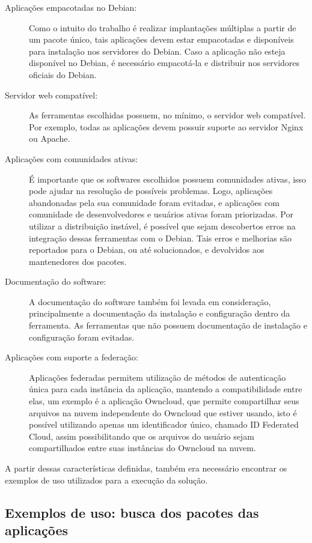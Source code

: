 \begin{description}
  \item  [Aplicações empacotadas no Debian:] Como o intuito do trabalho
  é realizar implantações múltiplas a partir de um pacote único, tais aplicações
  devem estar empacotadas e disponíveis para instalação nos servidores do Debian. Caso
a aplicação não esteja disponível no Debian, é necessário empacotá-la e distribuir
nos servidores oficiais do Debian.
 \item  [Servidor web compatível:] As ferramentas escolhidas possuem, no
  mínimo, o servidor web compatível. Por exemplo, todas as aplicações devem 
possuir suporte ao servidor Nginx ou Apache.
  \item  [Aplicações com comunidades ativas:] É importante que os softwares 
escolhidos possuem comunidades ativas, isso pode ajudar na resolução de possíveis 
problemas. Logo, aplicações abandonadas pela sua comunidade foram evitadas, e
  aplicações com comunidade de desenvolvedores e usuários ativas foram priorizadas.
  Por utilizar a distribuição instável, é possível que sejam descobertos
  erros na integração dessas ferramentas com o Debian. Tais erros e melhorias são
  reportados para o Debian, ou até solucionados, e 
  devolvidos aos mantenedores dos pacotes.
  \item  [Documentação do software:] A documentação do software também foi
  levada em consideração, principalmente a documentação da instalação e configuração
  dentro da ferramenta. As ferramentas que não possuem documentação de instalação e
  configuração foram evitadas.
  \item  [Aplicações com suporte a federação:] Aplicações federadas permitem
 utilização de métodos de autenticação única para cada instância da aplicação,
mantendo a compatibilidade entre elas, um exemplo é a aplicação Owncloud,
que permite compartilhar seus arquivos na nuvem independente do Owncloud que estiver usando,
isto é possível utilizando apenas um identificador único, chamado ID Federated Cloud, assim
possibilitando que os arquivos do usuário sejam compartilhados entre suas instâncias do
Owncloud na nuvem.
\end{description}

A partir dessas características definidas, também era necessário encontrar os exemplos de uso
utilizados para a execução da solução.

\subsection{Exemplos de uso: busca dos pacotes das aplicações}
\label{subsection:exemplos}

